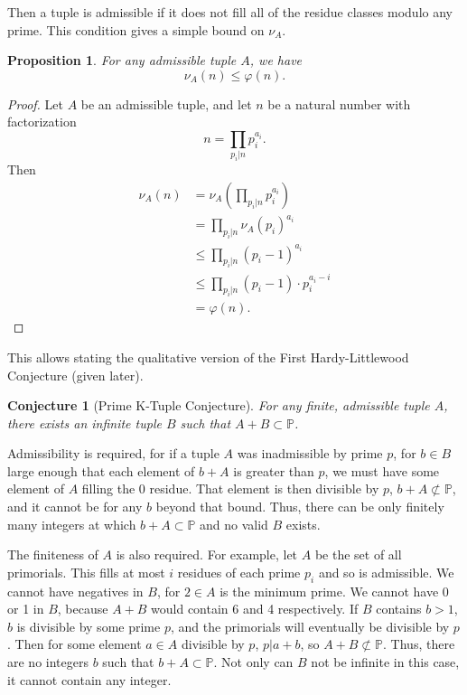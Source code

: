 \documentclass[11pt, leqno]{article}
\newtheorem{proposition}[theorem]{Proposition}
\newtheorem{conjecture}[theorem]{Conjecture}
\begin{document}
Then a tuple is admissible if it does not fill all of the residue classes modulo any prime.
This condition gives a simple bound on $\nu_A$.

\begin{proposition}
    For any admissible tuple $A$, we have
    $$\nu_A(n) \leq \varphi(n).$$
\end{proposition}
\begin{proof}
    Let $A$ be an admissible tuple, and let $n$ be a natural number with factorization
    $$n=\prod_{p_i|n}p_i^{a_i}.$$
    Then 
    \begin{align*}
        \nu_A(n) 
        &= \nu_A\left(\prod_{p_i|n}p_i^{a_i}\right) \\
        &= \prod_{p_i|n}\nu_A(p_i)^{a_i} \\
        &\leq \prod_{p_i|n}(p_i-1)^{a_i} \\
        &\leq \prod_{p_i|n}(p_i-1)\cdot p_i^{a_i-i} \\
        &= \varphi(n).
    \end{align*}
\end{proof}

This allows stating the qualitative version of the First Hardy-Littlewood
Conjecture (given later).

\begin{conjecture}[Prime K-Tuple Conjecture]
For any finite, admissible tuple $A$, there exists an infinite tuple $B$ such 
that $A+B\subset \mathbb{P}$.
\end{conjecture}

Admissibility is required, for if a tuple $A$ was inadmissible by prime $p$, for $b\in B$ large enough that each element
of $b+A$ is greater than $p$, we must have some element of $A$ filling the 0 residue.
That element is then divisible by $p$, $b+A\not\subset\mathbb{P}$, and it cannot be for any $b$ beyond that bound.
Thus, there can be only finitely many integers at which $b+A\subset\mathbb{P}$ and no valid $B$ exists.

The finiteness of $A$ is also required. 
For example, let $A$ be the set of all primorials.
This fills at most $i$ residues of each prime $p_i$ and so is admissible.
We cannot have negatives in $B$, for $2\in A$ is the minimum prime.
We cannot have 0 or 1 in $B$, because $A+B$ would contain 6 and 4 respectively.
If $B$ contains $b>1$, $b$ is divisible by some prime $p$, and the primorials will eventually be divisible by $p$.
Then for some element $a\in A$ divisible by $p$, $p|a+b$, so $A+B\not\subset\mathbb{P}$.
Thus, there are no integers $b$ such that $b+A\subset\mathbb{P}$.
Not only can $B$ not be infinite in this case, it cannot contain any integer.
\end{document}
